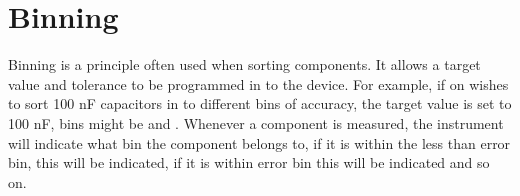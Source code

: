 \section{Binning} \label{sec:5_1_Binning}
Binning is a principle often used when sorting components. It allows a target value and tolerance to be programmed in to the device. For example, if on wishes to sort 100 nF capacitors in to different bins of accuracy, the target value is set to 100 nF, bins might be  and . Whenever a component is measured, the instrument will indicate what bin the component belongs to, if it is within the less than  error bin, this will be indicated, if it is within  error bin this will be indicated and so on.